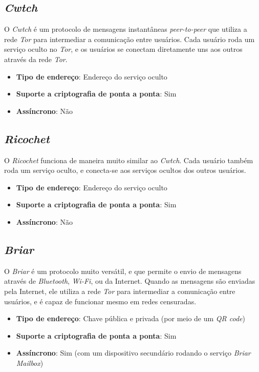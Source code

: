 \subsection{\textit{Cwtch}}

O \textit{Cwtch} é um protocolo de mensagens instantâneas \textit{peer-to-peer} que utiliza a rede \textit{Tor} para intermediar a comunicação entre usuários. Cada usuário roda um serviço oculto no \textit{Tor}, e os usuários se conectam diretamente uns aos outros através da rede \textit{Tor}. \cite{cwtch}

\begin{itemize}
  \item \textbf{Tipo de endereço}: Endereço do serviço oculto
  \item \textbf{Suporte a criptografia de ponta a ponta}: Sim
  \item \textbf{Assíncrono}: Não
\end{itemize}

\subsection{\textit{Ricochet}}

O \textit{Ricochet} funciona de maneira muito similar ao \textit{Cwtch}. Cada usuário também roda um serviço oculto, e conecta-se aos serviços ocultos dos outros usuários. \cite{ricochet}

\begin{itemize}
  \item \textbf{Tipo de endereço}: Endereço do serviço oculto
  \item \textbf{Suporte a criptografia de ponta a ponta}: Sim
  \item \textbf{Assíncrono}: Não
\end{itemize}

\subsection{\textit{Briar}}

O \textit{Briar} é um protocolo muito versátil, e que permite o envio de mensagens através de \textit{Bluetooth}, \textit{Wi-Fi}, ou da Internet. Quando as mensagens são enviadas pela Internet, ele utiliza a rede \textit{Tor} para intermediar a comunicação entre usuários, e é capaz de funcionar mesmo em redes censuradas. \cite{briar}

\begin{itemize}
  \item \textbf{Tipo de endereço}: Chave pública e privada (por meio de um \textit{QR code})
  \item \textbf{Suporte a criptografia de ponta a ponta}: Sim
  \item \textbf{Assíncrono}: Sim (com um dispositivo secundário rodando o serviço \textit{Briar Mailbox})
\end{itemize}

